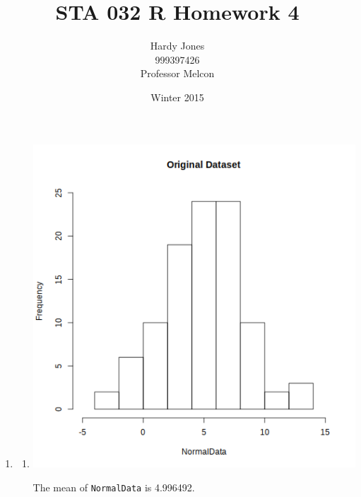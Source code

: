 \documentclass[12pt,letterpaper]{article}
\title{STA 032 R Homework 4\vspace{-2ex}}
\author{Hardy Jones\\
        999397426\\
        Professor Melcon\vspace{-2ex}}
\date{Winter 2015}
\begin{document}
  \maketitle


  \begin{enumerate}
    \item
      \begin{enumerate}
        \item
          \includegraphics[width=\linewidth]{prob1a.png}

          The mean of \texttt{NormalData} is \num{4.996492}.


\end{enumerate}
\end{enumerate}
\end{document}
